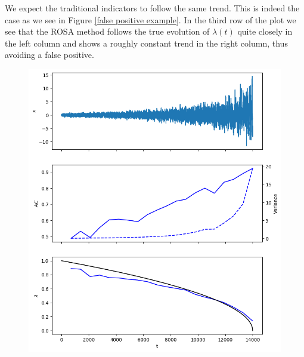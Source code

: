 \documentclass[%
thesis=student,%
coverpage=false,%
titlepage=false,%
headmarks=true, %
english,%
font=libertine, %
math=newpxtx, %
BCOR=5mm,%
coverBCOR=11mm%
]{tumbook}
\begin{document}
We expect the traditional indicators to follow the same trend. This is indeed the case as we see in Figure \ref{false positive example}. In the third row of the plot we see that the ROSA method follows the true evolution of $\lambda(t)$ quite closely in the left column and shows a roughly constant trend in the right column, thus avoiding a false positive.

\begin{figure}
    \begin{minipage}{0.49\textwidth}
        \centering
        \includegraphics[width=\textwidth]{figures/true_positive.png}
    \end{minipage}
    \hfill
    \begin{minipage}{0.49\textwidth}
        \centering

\end{minipage}
\end{figure}
\end{document}
